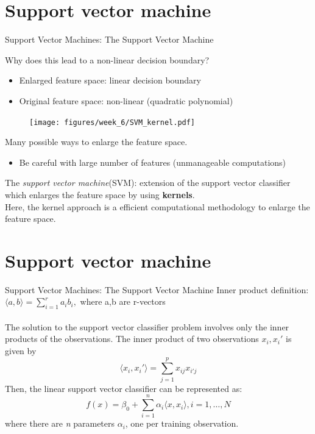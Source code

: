 \documentclass[notes]{beamer}          %
\begin{document}
\section{Support vector machine}
\begin{frame}{Support Vector Machines: The Support Vector Machine}

Why does this lead to a non-linear decision boundary?
\begin{itemize}
 \item Enlarged feature space: linear decision boundary
 \item Original feature space: non-linear (quadratic polynomial)
\end{itemize}
\begin{figure}
  \texttt{[image: figures/week\_6/SVM\_kernel.pdf]}  
\end{figure}
Many possible ways to enlarge the feature space.
\begin{itemize}
 \item Be careful with large number of features (unmanageable computations)\\
\end{itemize}

The \textit{support vector machine}(SVM): extension of the support vector classifier which enlarges the feature space by using \textbf{kernels}.\\

Here, the kernel approach is a efficient computational methodology to enlarge the feature space.
\end{frame}

\section{Support vector machine}
\begin{frame}{Support Vector Machines: The Support Vector Machine}
Inner product definition:$\langle {a,b} \rangle = \sum_{i=1}^{r} a_{i}b_{i},$ where a,b are r-vectors\\~\\
The solution to the support vector classifier problem involves only the inner products of the observations. The inner product of two observations $x_i, x_i'$ is given by
\begin{equation*}
\langle {x_i,x_i'} \rangle = \sum_{j=1}^{p} x_{ij} x_{i'j}
\end{equation*}
Then, the linear support vector classifier can be represented as:
\begin{equation*}
f(x) = \beta_0 + \sum_{i=1}^{n} \alpha_i \langle {x,x_i} \rangle, i=1, \dots, N
\end{equation*}
where there are \textit{n} parameters $\alpha_i$, one per training observation.
\end{frame}
\end{document}
